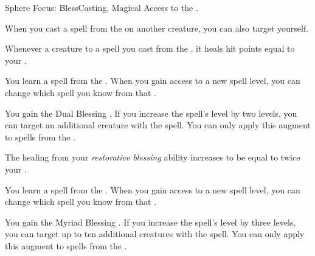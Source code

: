     \begin{feat}{Sphere Focus: Bless}{Casting, Magical}
        \featpre Access to the  .

         When you cast a spell from the   on another creature, you can also target yourself.

         Whenever a creature  to a spell you cast from the  , it heals hit points equal to your .

         You learn a spell from the  .
        When you gain access to a new spell level, you can change which spell you know from that .

         You gain the Dual Blessing .
        If you increase the spell's level by two levels, you can target an additional creature with the spell.
        You can only apply this augment to  spells from the  .

         The healing from your \textit{restorative blessing} ability increases to be equal to twice your .

         You learn a spell from the  .
        When you gain access to a new spell level, you can change which spell you know from that .

         You gain the Myriad Blessing .
        If you increase the spell's level by three levels, you can target up to ten additional creatures with the spell.
        You can only apply this augment to  spells from the  .
    \end{feat}

